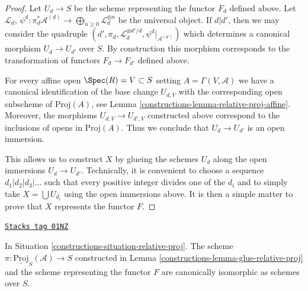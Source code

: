 \begin{proof}

Let $U_d \to S$ be the scheme representing the functor $F_d$
defined above. Let $\mathcal{L}_d$,
$\psi^d : \pi_d^*\mathcal{A}^{(d)} \to
\bigoplus_{n \geq 0} \mathcal{L}_d^{\otimes n}$ be the universal object.
If $d | d'$, then we may consider the quadruple
$(d', \pi_d, \mathcal{L}_d^{\otimes d'/d}, \psi^d|_{\mathcal{A}^{(d')}})$
which determines a canonical morphism $U_d \to U_{d'}$ over $S$.
By construction this morphism corresponds to the transformation
of functors $F_d \to F_{d'}$ defined above.

\medskip\noindent
For every affine open $\Spec(R) = V \subset S$
setting $A = \Gamma(V, \mathcal{A})$ we have a canonical
identification of the base change $U_{d, V}$ with the corresponding open
subscheme of $\text{Proj}(A)$, see Lemma \ref{constructions-lemma-relative-proj-affine}.
Moreover, the morphisms $U_{d, V} \to U_{d', V}$ constructed above
correspond to the inclusions of opens in $\text{Proj}(A)$.
Thus we conclude that $U_d \to U_{d'}$ is an open immersion.

\medskip\noindent
This allows us to construct $X$
by glueing the schemes $U_d$ along the open immersions $U_d \to U_{d'}$.
Technically, it is convenient to choose a sequence
$d_1 | d_2 | d_3 | \ldots$ such that every positive integer
divides one of the $d_i$ and to simply take
$X = \bigcup U_{d_i}$ using the open immersions above.
It is then a simple matter to prove that $X$ represents the
functor $F$.
\end{proof}

\begin{lemma}
\label{constructions-lemma-glueing-gives-functor-proj}
\href{https://stacks.math.columbia.edu/tag/01NZ}{\texttt{Stacks tag 01NZ}}

In Situation \ref{constructions-situation-relative-proj}.
The scheme $\pi : \underline{\text{Proj}}_S(\mathcal{A}) \to S$
constructed in Lemma \ref{constructions-lemma-glue-relative-proj}
and the scheme representing the functor $F$
are canonically isomorphic as schemes over $S$.
\end{lemma}

